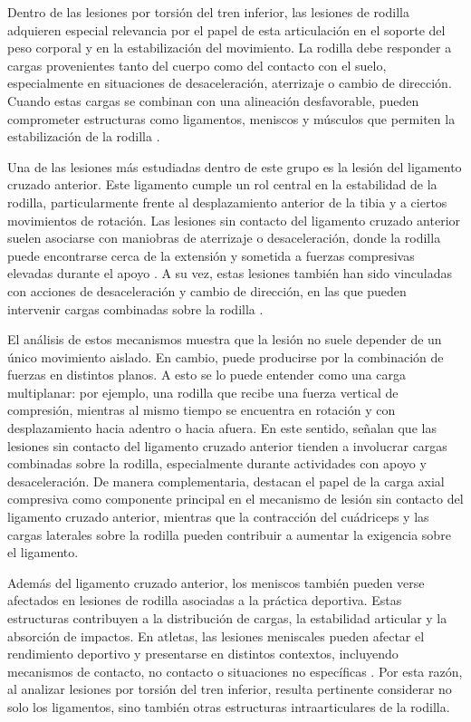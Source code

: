 

Dentro de las lesiones por torsión del tren inferior, las lesiones de rodilla adquieren especial
relevancia por el papel de esta articulación en el soporte del peso corporal y en la
estabilización del movimiento. La rodilla debe responder a cargas provenientes tanto del cuerpo
como del contacto con el suelo, especialmente en situaciones de desaceleración, aterrizaje o
cambio de dirección. Cuando estas cargas se combinan con una alineación desfavorable, pueden
comprometer estructuras como ligamentos, meniscos y músculos que permiten la estabilización de
la rodilla \parencite{ShimokochiShultz2008,MakkiEtAl2022}.

Una de las lesiones más estudiadas dentro de este grupo es la lesión del ligamento cruzado
anterior. Este ligamento cumple un rol central en la estabilidad de la rodilla, particularmente
frente al desplazamiento anterior de la tibia y a ciertos movimientos de rotación. Las lesiones
sin contacto del ligamento cruzado anterior suelen asociarse con maniobras de aterrizaje o
desaceleración, donde la rodilla puede encontrarse cerca de la extensión y sometida a fuerzas
compresivas elevadas durante el apoyo \parencite{BodenSheehan2022}. A su vez, estas lesiones
también han sido vinculadas con acciones de desaceleración y cambio de dirección, en las que
pueden intervenir cargas combinadas sobre la rodilla \parencite{ShimokochiShultz2008}.

El análisis de estos mecanismos muestra que la lesión no suele depender de un único movimiento
aislado. En cambio, puede producirse por la combinación de fuerzas en distintos planos. A esto
se lo puede entender como una carga multiplanar: por ejemplo, una rodilla que recibe una fuerza
vertical de compresión, mientras al mismo tiempo se encuentra en rotación y con desplazamiento
hacia adentro o hacia afuera. En este sentido, \textcite{ShimokochiShultz2008} señalan que las
lesiones sin contacto del ligamento cruzado anterior tienden a involucrar cargas combinadas sobre
la rodilla, especialmente durante actividades con apoyo y desaceleración. De manera
complementaria, \textcite{BodenSheehan2022} destacan el papel de la carga axial compresiva como
componente principal en el mecanismo de lesión sin contacto del ligamento cruzado anterior,
mientras que la contracción del cuádriceps y las cargas laterales sobre la rodilla pueden
contribuir a aumentar la exigencia sobre el ligamento.

Además del ligamento cruzado anterior, los meniscos también pueden verse afectados en lesiones
de rodilla asociadas a la práctica deportiva. Estas estructuras contribuyen a la distribución de
cargas, la estabilidad articular y la absorción de impactos. En atletas, las lesiones meniscales
pueden afectar el rendimiento deportivo y presentarse en distintos contextos, incluyendo
mecanismos de contacto, no contacto o situaciones no específicas \parencite{MakkiEtAl2022}. Por
esta razón, al analizar lesiones por torsión del tren inferior, resulta pertinente considerar no
solo los ligamentos, sino también otras estructuras intraarticulares de la rodilla.

